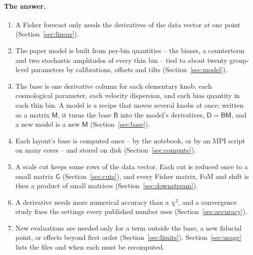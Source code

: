 \documentclass[11pt]{article}
\newcommand{\mB}{\mathsf{B}}
\newcommand{\mM}{\mathsf{M}}
\newcommand{\mD}{\mathsf{D}}
\newcommand{\mG}{\mathsf{G}}
\begin{document}
\paragraph{The answer.}
\begin{enumerate}
  \item A Fisher forecast only needs the derivatives of the data vector
    at one point (Section~\ref{sec:linear}).
  \item The paper model is built from per-bin quantities -- the
    biases, a counterterm and two stochastic amplitudes of every
    thin bin -- tied to about twenty group-level parameters by
    calibrations, offsets and tilts (Section~\ref{sec:model}).
  \item The base is one derivative column for each elementary knob:
    each cosmological parameter, each velocity dispersion, and each
    bias quantity in each thin bin.  A model is a recipe that moves
    several knobs at once; written as a matrix $\mM$, it turns the
    base $\mB$ into the model's derivatives, $\mD = \mB\mM$, and a new
    model is a new $\mM$ (Section~\ref{sec:base}).
  \item Each layout's base is computed once -- by the notebook, or by an
    MPI script on many cores -- and stored on disk
    (Section~\ref{sec:compute}).
  \item A scale cut keeps some rows of the data vector.  Each cut is
    reduced once to a small matrix $\mG$ (Section~\ref{sec:cuts}), and
    every Fisher matrix, FoM and shift is then a product of small
    matrices (Section~\ref{sec:downstream}).
  \item A derivative needs more numerical accuracy than a $\chi^2$, and a
    convergence study fixes the settings every published number uses
    (Section~\ref{sec:accuracy}).
  \item New evaluations are needed only for a term outside the base, a
    new fiducial point, or effects beyond first order
    (Section~\ref{sec:limits}).  Section~\ref{sec:usage} lists the files
    and when each must be recomputed.
\end{enumerate}
\end{document}
